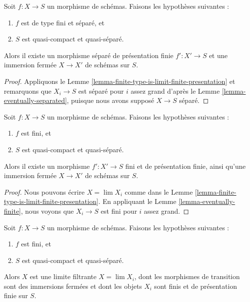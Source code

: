 \begin{proposition}
\label{proposition-separated-closed-in-finite-presentation}
Soit $f : X \to S$ un morphisme de schémas. Faisons les hypothèses suivantes :
\begin{enumerate}
\item $f$ est de type fini et séparé, et
\item $S$ est quasi-compact et quasi-séparé.
\end{enumerate}
Alors il existe un morphisme séparé de présentation finie $f' : X' \to S$
et une immersion fermée $X \to X'$ de schémas sur $S$.
\end{proposition}

\begin{proof}
Appliquons le Lemme \ref{lemma-finite-type-is-limit-finite-presentation} et
remarquons que $X_i \to S$ est séparé pour $i$ assez grand d'après le
Lemme \ref{lemma-eventually-separated}, puisque nous avons supposé
$X \to S$ séparé.
\end{proof}

\begin{lemma}
\label{lemma-finite-closed-in-finite-finite-presentation}
Soit $f : X \to S$ un morphisme de schémas. Faisons les hypothèses suivantes :
\begin{enumerate}
\item $f$ est fini, et
\item $S$ est quasi-compact et quasi-séparé.
\end{enumerate}
Alors il existe un morphisme $f' : X' \to S$ fini et de présentation finie,
ainsi qu'une immersion fermée $X \to X'$ de schémas sur $S$.
\end{lemma}

\begin{proof}
Nous pouvons écrire $X = \lim X_i$ comme dans le
Lemme \ref{lemma-finite-type-is-limit-finite-presentation}. En appliquant le
Lemme \ref{lemma-eventually-finite}, nous voyons que $X_i \to S$ est fini
pour $i$ assez grand.
\end{proof}

\begin{lemma}
\label{lemma-finite-in-finite-and-finite-presentation}
Soit $f : X \to S$ un morphisme de schémas. Faisons les hypothèses suivantes :
\begin{enumerate}
\item $f$ est fini, et
\item $S$ est quasi-compact et quasi-séparé.
\end{enumerate}
Alors $X$ est une limite filtrante $X = \lim X_i$, dont les morphismes de
transition sont des immersions fermées et dont les objets $X_i$ sont finis
et de présentation finie sur $S$.
\end{lemma}

